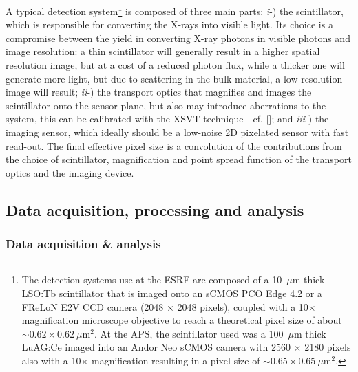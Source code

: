 \begin{refsection}
A typical detection system\footnote{The detection systems use at the ESRF are composed of a 10~$\mu$m thick LSO:Tb scintillator that is imaged onto an sCMOS PCO Edge 4.2 or a FReLoN E2V CCD camera (2048 $\times$ 2048 pixels), coupled with a 10$\times$ magnification microscope objective to reach a theoretical pixel size of about $\sim0.62\times0.62~\mu$m$^2$. At the APS, the scintillator used was a 100~$\mu$m thick LuAG:Ce imaged into an Andor Neo sCMOS camera with 2560 $\times$ 2180 pixels also with a 10$\times$ magnification resulting in a pixel size of $\sim0.65\times0.65~\mu$m$^2$.} is composed of three main parts: \textit{i}-) the scintillator, which is responsible for converting the X-rays into visible light. Its choice is a compromise between the yield in converting X-ray photons in visible photons and image resolution: a thin scintillator will generally result in a higher spatial resolution image, but at a cost of a reduced photon flux, while a thicker one will generate more light, but due to scattering in the bulk material, a low resolution image will result; \textit{ii}-) the transport optics that magnifies and images the scintillator onto the sensor plane, but also may introduce aberrations to the system, this can be calibrated with the XSVT technique - cf. [\cite[\textit{\S2.2}]{Berujon2020a}]; and \textit{iii}-) the imaging sensor, which ideally should be a low-noise 2D pixelated sensor with fast read-out. The final effective pixel size is a convolution of the contributions from the choice of scintillator, magnification and point spread function of the transport optics and the imaging device.

\subsection{Data acquisition, processing and analysis}\label{sec:data}

\subsubsection*{Data acquisition \& analysis}


\end{refsection}
